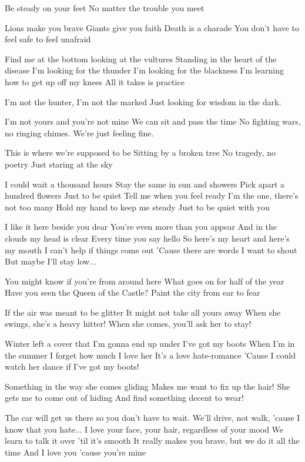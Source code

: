 Be steady on your feet
No matter the trouble you meet

Lions make you brave
Giants give you faith
Death is a charade
You don't have to feel safe to feel unafraid

Find me at the bottom looking at the vultures
Standing in the heart of the disease
I'm looking for the thunder
I'm looking for the blackness
I'm learning how to get up off my knees
All it takes is practice

I'm not the hunter, I'm not the marked
Just looking for wisdom in the dark.


I'm not yours and you're not mine
We can sit and pass the time
No fighting wars, no ringing chimes.
We're just feeling fine.

This is where we're supposed to be
Sitting by a broken tree
No tragedy, no poetry
Just staring at the sky

I could wait a thousand hours
Stay the same in sun and showers
Pick apart a hundred flowers
Just to be quiet
Tell me when you feel ready
I'm the one, there's not too many
Hold my hand to keep me steady
Just to be quiet with you

I like it here beside you dear
You're even more than you appear
And in the clouds my head is clear
Every time you say hello
So here's my heart and here's my mouth
I can't help if things come out
'Cause there are words I want to shout
But maybe I'll stay low...


You might know if you're from around here
What goes on for half of the year
Have you seen the Queen of the Castle?
Paint the city from ear to fear

If the air was meant to be glitter
It might not take all yours away
When she swings, she's a heavy hitter!
When she comes, you'll ask her to stay!

Winter left a cover that I'm gonna end up under
I've got my boots
When I'm in the summer I forget how much I love her
It's a love hate-romance
'Cause I could watch her dance if I've got my boots!

Something in the way she comes gliding
Makes me want to fix up the hair!
She gets me to come out of hiding
And find something decent to wear!


The car will get us there so you don't have to wait.
We'll drive, not walk, 'cause I know that you hate...
I love your face, your hair, regardless of your mood
We learn to talk it over 'til it's smooth
It really makes you brave, but we do it all the time
And I love you 'cause you're mine

